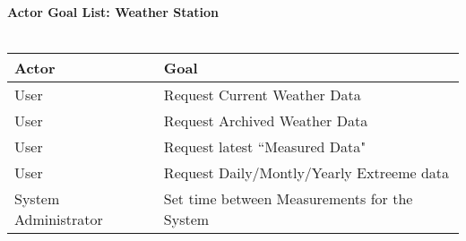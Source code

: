 \documentclass[letterpaper]{article}
\begin{document}
\noindent
\textbf{Actor Goal List:  Weather Station}\\\\
\vspace{4ex}
\begin{tabular}{|p{3.5cm}|p{5cm}|}\hline
\textbf{Actor} & \textbf{Goal}\\\hline
User & Request Current Weather Data\\\hline
User & Request Archived Weather Data\\\hline
User & Request latest ``Measured Data"\\\hline
User & Request Daily/Montly/Yearly Extreeme data\\\hline
System Administrator & Set time between Measurements for the 
System\\\hline
\end{tabular}
\end{document}
